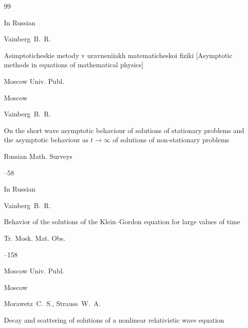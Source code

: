 \begin{thebibliography}{99}

\lang In Russian

\by Vainberg~B.~R.

\book Asimptoticheskie metody v uravneniiakh matematicheskoi fiziki \rm [Asymptotic methods in equations of mathematical physics]


\publ Moscow Univ. Publ.

\publaddr Moscow





\by Vainberg~B.~R.

\paper On the short wave asymptotic behaviour of solutions of stationary problems and the asymptotic behaviour as $t\to \infty$ of solutions of non-stationary problems



\jour Russian Math. Surveys




--58





\lang In Russian

\by Vainberg~B.~R.

\paper Behavior of the solutions of the Klein--Gordon equation for large values of time

\serial Tr. Mosk. Mat. Obs.



--158

\publ Moscow Univ. Publ.

\publaddr Moscow








\by Morawetz~C.~S., Strauss~W.~A.

\paper Decay and scattering of solutions of a nonlinear relativistic wave equation


\end{thebibliography}
